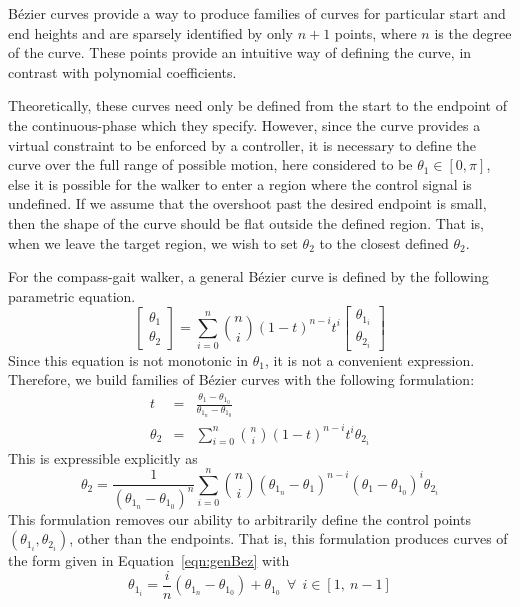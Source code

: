Bézier curves provide a way to produce families of curves for particular start and end heights and are sparsely identified by only $n+1$ points, where $n$ is the degree of the curve. These points provide an intuitive way of defining the curve, in contrast with polynomial coefficients.
\par

Theoretically, these curves need only be defined from the start to the endpoint of the continuous-phase which they specify. However, since the curve provides a virtual constraint to be enforced by a controller, it is necessary to define the curve over the full range of possible motion, here considered to be $\theta_1 \in \left[0, \pi\right]$, else it is possible for the walker to enter a region where the control signal is undefined. If we assume that the overshoot past the desired endpoint is small, then the shape of the curve should be flat outside the defined region. That is, when we leave the target region, we wish to set $\theta_2$ to the closest defined $\theta_2$. \\ \par

For the compass-gait walker, a general Bézier curve is defined by the following parametric equation.
\begin{equation}
	\begin{bmatrix}
		\theta_1 \\ \theta_2
	\end{bmatrix}
	=
	\sum_{i=0}^{n}\binom{n}{i}\left(1-t\right)^{n-i}t^i
	\begin{bmatrix}
		\theta_{1_i} \\ \theta_{2_i}
	\end{bmatrix} \label{eqn:genBez}
\end{equation}
Since this equation is not monotonic in $\theta_1$, it is not a convenient expression. Therefore, we build families of Bézier curves with the following formulation:
\begin{eqnarray}
	t &=& \frac{\theta_1 - \theta_{1_0}}{\theta_{1_n} - \theta_{1_0}} \\
	\theta_2 &=& \sum_{i=0}^{n}\binom{n}{i}\left(1-t\right)^{n-i}t^i\theta_{2_i}
\end{eqnarray}
This is expressible explicitly as
\begin{equation}
	\theta_2 = \frac{1}{\left(\theta_{1_n} - \theta_{1_0}\right)^n}\sum_{i=0}^{n}\binom{n}{i}
		\left(\theta_{1_n} - \theta_1\right)^{n-i}
		\left(\theta_1 - \theta_{1_0}\right)^i\theta_{2_i} \label{eqn:expBez}
\end{equation}
This formulation removes our ability to arbitrarily define the control points $\left(\theta_{1_i}, \theta_{2_i}\right)$, other than the endpoints. That is, this formulation produces curves of the form given in Equation~\ref{eqn:genBez} with
\begin{equation}
	\theta_{1_i} = \frac{i}{n}\left(\theta_{1_n}-\theta_{1_0}\right) + \theta_{1_0} ~~
	\forall ~~ i \in \left[1,~n-1\right]
\end{equation}

